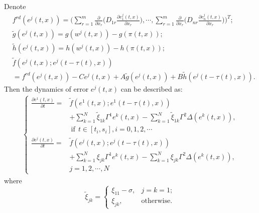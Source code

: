 \documentclass[review]{elsarticle}
\begin{document}
Denote
\begin{align*}
&f^{rd}(e^j(t,x))=\Bigg(\sum\limits_{r=1}^m\frac{\partial{}}{\partial{x}_r}
\bigg(D_{1r}\frac{\partial{e}_1^j(t,x)}{\partial{x}_r}\bigg),\cdots,
\sum\limits_{r=1}^m\frac{\partial{}}{\partial{x}_r}
\bigg(D_{nr}\frac{\partial{e}_n^j(t,x)}{\partial{x}_r}\bigg)
\Bigg)^T;\\
&\tilde{g}(e^j(t,x))=g(w^j(t,x))-g(\pi(t,x));\\
&\tilde{h}(e^j(t,x))=h(w^j(t,x))-h(\pi(t,x));\\
&\tilde{f}(e^j(t,x);e^j(t-\tau(t),x))\nonumber\\
&=f^{rd}(e^j(t,x))-Ce^j(t,x)+A\tilde{g}(e^j(t,x))+B\tilde{h}(e^j(t-\tau(t),x)).
\end{align*}
Then the dynamics of error $e^j(t,x)$ can be described as:
\begin{align}\label{m-2}
\left\{
\begin{array}{cl}
\frac{\partial{e^1(t,x)}}{\partial{t}}=&\tilde{f}(e^1(t,x);e^1(t-\tau(t),x))\\
&+\sum\limits_{k=1}^N\tilde{\xi}_{1k}\Gamma^1
e^k(t,x)-\sum\limits_{k=1}^N\tilde{\xi}_{1k}\Gamma^2
\Delta(e^k(t,x)),\\
&~\mathrm{if}~~t\in [t_i,s_i], i=0,1,2,\cdots\\
\frac{\partial{e^j(t,x)}}{\partial{t}}=&\tilde{f}(e^j(t,x);e^j(t-\tau(t),x))\\
&+\sum\limits_{k=1}^N\xi_{jk}\Gamma^1
e^k(t,x)-\sum\limits_{k=1}^N\xi_{jk}\Gamma^2
\Delta(e^k(t,x)),\\
&j=1,2,\cdots,N
\end{array}
\right.
\end{align}
where
\[
\tilde{\xi}_{jk}=\left\{\begin{array}{ll}\xi_{11}-\sigma, &j=k=1;\\
\xi_{jk}, &\mathrm{otherwise}.\end{array}\right.
\]
\end{document}
